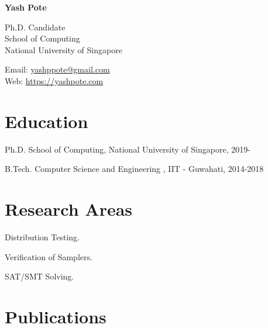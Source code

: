 \documentclass[12pt,letterpaper]{report}
\newcommand{\myname}{Yash Pote}
\newcommand{\namefont}[1]{{\normalfont\bfseries\Huge{#1}}}
\newcommand{\listitemspace}{0.15em}
\renewenvironment{itemize}
{\begin{list}{}{\setlength{\leftmargin}{0em}
            \setlength{\parskip}{0em}
            \setlength{\itemsep}{\listitemspace}
            \setlength{\parsep}{\listitemspace}}}
    {\end{list}}
\begin{document}
    \raggedright

    \namefont{\myname}

    \vspace{1em}
    \begin{minipage}[t]{0.68\textwidth}
    	Ph.D. Candidate \\
        School of Computing \\
		National University of Singapore
    \end{minipage}
    \begin{minipage}[t]{0.31\textwidth}
        Email: \href{mailto:yashppote@gmail.com}{yashppote@gmail.com} \\
        Web: \href{https://yashpote.com}{https://yashpote.com}
    \end{minipage}
    \vspace{0.5em}



    \section*{Education}

    \begin{tablist}

        \item[Ph.D.] \tab School of Computing, National University of Singapore, 2019-

        \item[B.Tech.]  \tab Computer Science and Engineering , IIT - Guwahati, 2014-2018
    \end{tablist}


    \section*{Research Areas}

    \begin{itemize}

	\item Distribution Testing.
	\item Verification of Samplers.
	\item SAT/SMT Solving. 
	
    \end{itemize}



    \section*{Publications}
\end{document}
